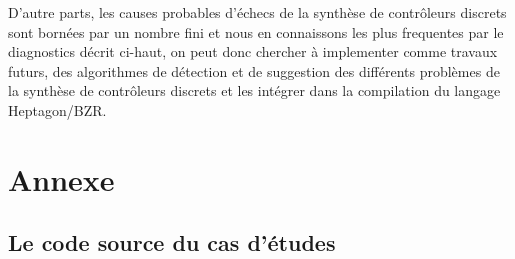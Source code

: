 \documentclass{svjour3}
\begin{document}
D'autre parts, les causes probables d'échecs de la synthèse de contrôleurs discrets sont bornées par un nombre fini et nous en connaissons les plus frequentes par 
le diagnostics décrit ci-haut, on peut donc chercher à implementer comme travaux futurs, des algorithmes de détection et de suggestion des différents problèmes de la 
synthèse de contrôleurs discrets et les intégrer dans la compilation du langage Heptagon/BZR.

\begin{acknowledgements}
\end{acknowledgements}
\newpage
\newpage
\section{Annexe}


\subsection*{Le code source du cas d'études}
\end{document}
